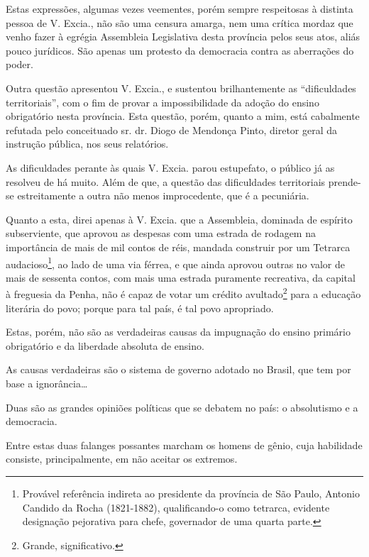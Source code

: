 Estas expressões, algumas vezes veementes, porém sempre respeitosas à
distinta pessoa de V. Excia., não são uma censura amarga, nem uma
crítica mordaz que venho fazer à egrégia Assembleia Legislativa desta
província pelos seus atos, aliás pouco jurídicos. São apenas um protesto
da democracia contra as aberrações do poder.

Outra questão apresentou V. Excia., e sustentou brilhantemente as
``dificuldades territoriais'', com o fim de provar a impossibilidade da
adoção do ensino obrigatório nesta província. Esta questão, porém,
quanto a mim, está cabalmente refutada pelo conceituado sr. dr. Diogo de
Mendonça Pinto, diretor geral da instrução pública, nos seus relatórios.

As dificuldades perante às quais V. Excia. parou estupefato, o público
já as resolveu de há muito. Além de que, a questão das dificuldades
territoriais prende-se estreitamente a outra não menos improcedente, que
é a pecuniária.

Quanto a esta, direi apenas à V. Excia. que a Assembleia, dominada de
espírito subserviente, que aprovou as despesas com uma estrada de
rodagem na importância de mais de mil contos de réis, mandada construir
por um Tetrarca audacioso\footnote{Provável referência indireta ao
  presidente da província de São Paulo, Antonio Candido da Rocha
  (1821-1882), qualificando-o como tetrarca, evidente designação
  pejorativa para chefe, governador de uma quarta parte.}, ao lado de
uma via férrea, e que ainda aprovou outras no valor de mais de sessenta
contos, com mais uma estrada puramente recreativa, da capital à
freguesia da Penha, não é capaz de votar um crédito avultado\footnote{
  Grande, significativo.} para a educação literária do povo; porque para
tal país, é tal povo apropriado.

Estas, porém, não são as verdadeiras causas da impugnação do ensino
primário obrigatório e da liberdade absoluta de ensino.

As causas verdadeiras são o sistema de governo adotado no Brasil, que
tem por base a ignorância\ldots

Duas são as grandes opiniões políticas que se debatem no país: o
absolutismo e a democracia.

Entre estas duas falanges possantes marcham os homens de gênio, cuja
habilidade consiste, principalmente, em não aceitar os extremos.


